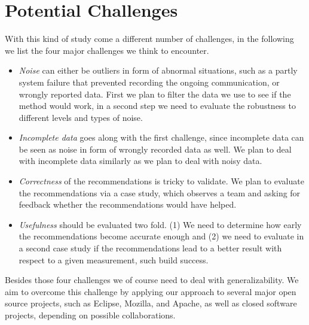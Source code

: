 \documentclass[12pt,oneside]{book}
\begin{document}


\section{Potential Challenges}
With this kind of study come a different number of challenges, in the following we list the four major challenges we think to encounter.
\begin{itemize}
\item \emph{Noise} can either be outliers in form of abnormal situations, such as a partly system failure that prevented recording the ongoing communication, or wrongly reported data.
First we plan to filter the data we use to see if the method would work, in a second step we need to evaluate the robustness to different levels and types of noise.
\item \emph{Incomplete data} goes along with the first challenge, since incomplete data can be seen as noise in form of wrongly recorded data as well.
We plan to deal with incomplete data similarly as we plan to deal with noisy data.
\item \emph{Correctness} of the recommendations is tricky to validate.
We plan to evaluate the recommendations via a case study, which observes a team and asking for feedback whether the recommendations would have helped. 
\item \emph{Usefulness} should be evaluated two fold. (1) We need to determine how early the recommendations become accurate enough and (2) we need to evaluate in a second case study if the recommendations lead to a better result with respect to a given measurement, such build success.
\end{itemize}
Besides those four challenges we of course need to deal with generalizability.
We aim to overcome this challenge by applying our approach to several major open source projects, such as Eclipse, Mozilla, and Apache, as well as closed software projects, depending on possible collaborations.
\end{document}
